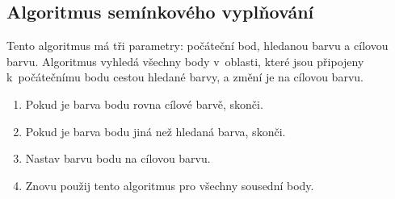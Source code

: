 \subsection*{Algoritmus semínkového vyplňování}
Tento algoritmus má tři parametry: počáteční bod, hledanou barvu a cílovou barvu. Algoritmus vyhledá všechny body v~oblasti, které jsou připojeny k~počátečnímu bodu cestou hledané barvy, a změní je na cílovou barvu.
  \begin{enumerate}
    \item Pokud je barva bodu rovna cílové barvě, skonči.
    \item Pokud je barva bodu jiná než hledaná barva, skonči.
    \item Nastav barvu bodu na cílovou barvu.
    \item Znovu použij tento algoritmus pro všechny sousední body.
  \end{enumerate}

